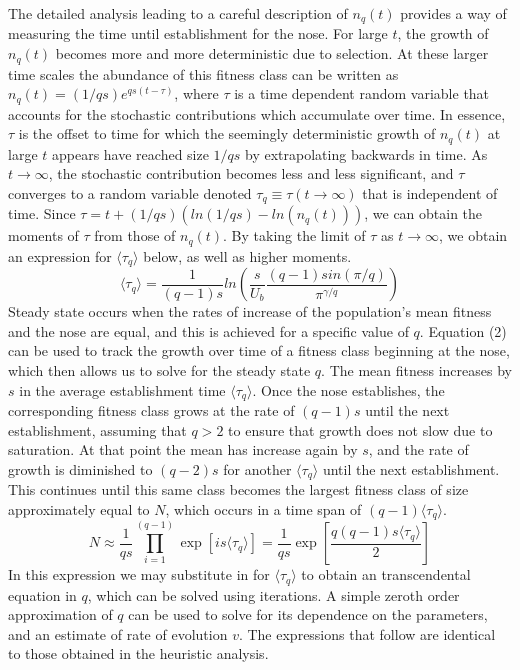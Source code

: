 \documentclass[12pt]{article}
\begin{document}
The detailed analysis leading to a careful description of $n_q(t)$ provides a way of measuring the time until establishment for the nose.  For large $t$, the growth of $n_q(t)$ becomes more and more deterministic due to selection.  At these larger time scales the abundance of this fitness class can be written as $n_q(t) = (1/qs) e^{qs(t-\tau)}$, where $\tau$ is a time dependent random variable that accounts for the stochastic contributions which accumulate over time.  In essence, $\tau$ is the offset to time for which the seemingly deterministic growth of $n_q(t)$ at large $t$ appears have reached size $1/qs$ by extrapolating backwards in time.  As $t\rightarrow \infty$, the stochastic contribution becomes less and less significant, and $\tau$ converges to a random variable denoted $\tau_q \equiv \tau (t\rightarrow \infty)$ that is independent of time.  Since $\tau = t +(1/qs)(ln(1/qs)-ln(n_q(t)))$, we can obtain the moments of $\tau$ from those of $n_q(t)$.  By taking the limit of $\tau$ as $t\rightarrow \infty$, we obtain an expression for $\langle \tau_q \rangle$ below, as well as higher moments. 
\begin{equation} 
\langle \tau_q \rangle = \frac{1}{(q-1)s}ln\left(\frac{s}{U_b}\frac{(q-1)sin(\pi/q)}{\pi^{\gamma/q}}\right)
\end{equation}
Steady state occurs when the rates of increase of the population's mean fitness and the nose are equal, and this is achieved for a specific value of $q$.  Equation (2) can be used to track the growth over time of a fitness class beginning at the nose, which then allows us to solve for the steady state $q$.  The mean fitness increases by $s$ in the average establishment time $\langle \tau_q \rangle$.  Once the nose establishes, the corresponding fitness class grows at the rate of $(q-1)s$ until the next establishment, assuming that $q>2$ to ensure that growth does not slow due to saturation.  At that point the mean has increase again by $s$, and the rate of growth is diminished to $(q-2)s$ for another $\langle \tau_q \rangle$ until the next establishment.  This continues until this same class becomes the largest fitness class of size approximately equal to $N$, which occurs in a time span of $(q-1) \langle \tau_q \rangle$.
\begin{equation}
N \approx \frac{1}{qs} \prod_{i=1}^{(q-1)} \exp[is \langle \tau_q \rangle]  = \frac{1}{qs} \exp\left[ \frac{q(q-1)s \langle \tau_q \rangle}{2}\right]  
\end{equation}
In this expression we may substitute in for $\langle \tau_q \rangle$ to obtain an transcendental equation in $q$, which can be solved using iterations.  A simple zeroth order approximation of $q$ can be used to solve for its dependence on the parameters, and an estimate of rate of evolution $v$. The expressions that follow are identical to those obtained in the heuristic analysis.
\end{document}
